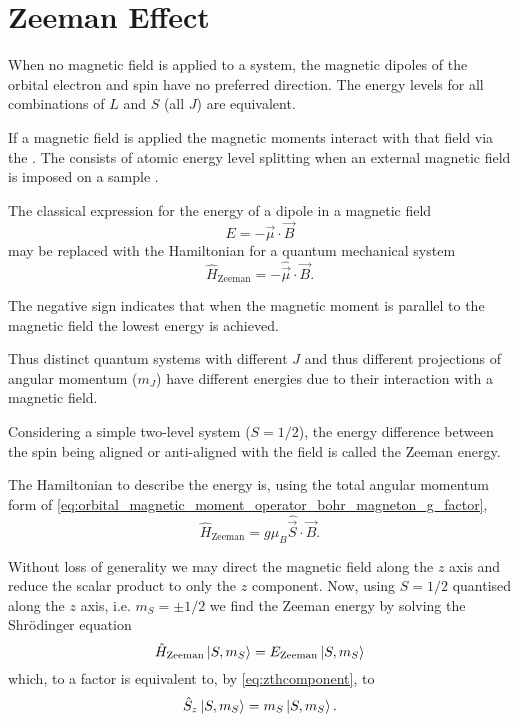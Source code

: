 \section{Zeeman Effect}\label{zeeman}
When no magnetic field is applied to a system, the magnetic dipoles of the orbital electron and spin have no preferred direction. 
The energy levels for all combinations of $L$ and $S$ (all $J$) are equivalent. 

If a magnetic field is applied the magnetic moments interact with that field via the . 
The  consists of atomic energy level splitting when an external magnetic field is imposed on a sample \cite{Nabokov2002}. 

The classical expression for the energy of a dipole in a magnetic field
\begin{equation}
    E = -\vec{\mu}\cdot\vec{B}
    \label{eq:}
\end{equation}
may be replaced with the Hamiltonian for a quantum mechanical system 
\begin{equation}
    \hat{H}_{\text{Zeeman}} = - \hat{\vec{\mu}}\cdot \vec{B}. 
    \label{eq:}
\end{equation}

The negative sign indicates that when the magnetic moment is parallel to the magnetic field the lowest energy is achieved. 

Thus distinct quantum systems with different $J$ and thus different projections of angular momentum ($m_J$) have different energies due to their interaction with a magnetic field. 

Considering a simple two-level system ($S=1/2$), the energy difference between the spin being aligned or anti-aligned with the field is called the Zeeman energy. 

The Hamiltonian to describe the energy is, using the total angular momentum form of \eqref{eq:orbital_magnetic_moment_operator_bohr_magneton_g_factor}, 
\begin{equation}
    \hat{H}_{\text{Zeeman}} = g \mu_B \hat{\vec{S}}\cdot\vec{B}. 
    \label{eq:}
\end{equation}

Without loss of generality we may direct the magnetic field along the $z$ axis and reduce the scalar product to only the $z$ component. Now, using $S=1/2$ quantised along the $z$ axis, i.e. $m_S = \pm 1/2$ we find the Zeeman energy by solving the Shr\"odinger equation 
\begin{equation}
    \hat{H}_{\text{Zeeman}} \ket{S, m_S} = E_{\text{Zeeman}}\ket{S, m_S} 
\end{equation}
which, to a factor is equivalent to, by \eqref{eq:zthcomponent}, to
\begin{equation}
    \hat{S}_{z} \ket{S, m_S} = m_S\ket{S, m_S}.
\end{equation}

